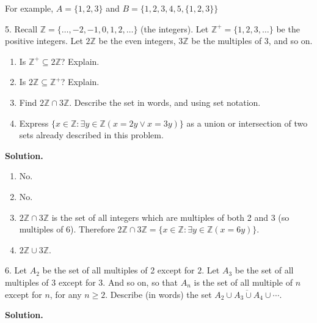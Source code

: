 \documentclass[10pt,]{book}
\theoremstyle{plain}
\theoremstyle{definition}
\theoremstyle{definition}
\theoremstyle{definition}
\def\Z{\mathbb Z}
\def\st{:}
\renewcommand{\bar}{\overline}
\begin{document}
\begin{exerciselist}
          For example, \(A = \{1,2,3\}\) and \(B = \{1,2,3,4,5,\{1,2,3\}\}\)
\item[5.]\hypertarget{exercise-15}{}
          Recall \(\Z = \{\ldots,-2,-1,0, 1,2,\ldots\}\) (the integers). Let \(\Z^+ = \{1, 2, 3, \ldots\}\) be the positive integers. Let \(2\Z\) be the even integers, \(3\Z\) be the multiples of 3, and so on.
\leavevmode%
\begin{enumerate}[label=(\alph*)]
\item\hypertarget{li-250}{} Is \(\Z^+ \subseteq 2\Z\)? Explain. %
\item\hypertarget{li-251}{} Is \(2\Z \subseteq \Z^+\)? Explain. %
\item\hypertarget{li-252}{} Find \(2\Z \cap 3\Z\). Describe the set in words, and using set notation. %
\item\hypertarget{li-253}{} Express \(\{x \in \Z \st \exists y\in \Z (x = 2y \vee x = 3y)\}\) as a union or intersection of two sets already described in this problem. %
\end{enumerate}
\par\smallskip
\par\smallskip
\noindent\textbf{Solution.}\hypertarget{solution-27}{}\quad
\leavevmode%
\begin{enumerate}[label=(\alph*)]
\item\hypertarget{li-254}{} No. %
\item\hypertarget{li-255}{} No. %
\item\hypertarget{li-256}{}\(2\Z \cap 3\Z\) is the set of all integers which are multiples of both 2 and 3 (so multiples of 6). Therefore \(2\Z \cap 3\Z = \{x \in \Z \st \exists y\in \Z(x = 6y)\}\).\item\hypertarget{li-257}{}\(2\Z \cup 3\Z\).\end{enumerate}
\item[6.]\hypertarget{exercise-16}{}
          Let \(A_2\) be the set of all multiples of 2 except for \(2\). Let \(A_3\) be the set of all multiples of 3 except for 3. And so on, so that \(A_n\) is the set of all multiple of \(n\) except for \(n\), for any \(n \ge 2\). Describe (in words) the set \(\bar{A_2 \cup A_3 \cup A_4 \cup \cdots}\).
\par\smallskip
\par\smallskip
\noindent\textbf{Solution.}\hypertarget{solution-28}{}\quad


\end{exerciselist}
\end{document}
